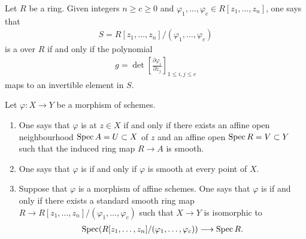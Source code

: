 \documentclass [11 pt, oneside] {article}
\begin{document}
\begin{definition}\label{}\text{}
Let $R$ be a ring. Given integers $n\ge c\ge 0$ and $\varphi_1,\hdots,\varphi_c\in R[z_1,\hdots, z_n]$, one says that 
\begin{align*}
	S = R[z_1,\hdots, z_n] /(\varphi_1,\hdots, \varphi_c)
\end{align*}
is a  over $R$ if and only if the polynomial
\begin{align*}
	g = \det \left[ \frac{\partial \varphi_i}{\partial z_j} \right]_{1\le i,j\le c} 
\end{align*}
maps to an invertible element in $S$.
\end{definition}


\begin{definition}\label{}\text{}
Let $\varphi : X\longrightarrow Y$ be a morphism of schemes.
\begin{enumerate}
	\item One says that $\varphi$ is  at $z\in X$ if and only if there exists an affine open neighbourhood $\operatorname{Spec} A = U\subset X$ of $z$ and an affine open $\operatorname{Spec} R = V\subset Y$ such that the induced ring map $R\longrightarrow A$ is smooth.
	\item One says that $\varphi$ is  if and only if $\varphi$ is smooth at every point of $X$.
	\item Suppose that $\varphi$ is a morphism of affine schemes. One says that $\varphi$ is  if and only if there exists a standard smooth ring map $R\longrightarrow R[z_1,\hdots,z_n]/(\varphi_1,\hdots,\varphi_c)$ such that $X\longrightarrow Y$ is isomorphic to 
		\begin{align*}
			\operatorname{Spec} (R[z_1,\hdots,z_n]/(\varphi_1,\hdots,\varphi_c)) \longrightarrow \operatorname{Spec} R.
		\end{align*}
\end{enumerate}
\end{definition}
\end{document}
